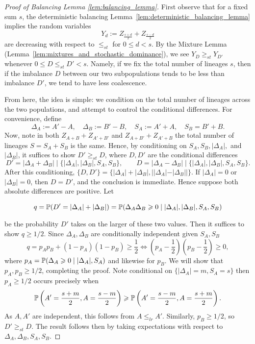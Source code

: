 \begin{proof}[Proof of Balancing Lemma \ref{lem:balancing_lemma}]
    First observe that for a fixed sum $s$, the deterministic balancing Lemma~\ref{lem:deterministic_balancing_lemma} implies the random variables
    \[Y_d := Z_{\frac{s+d}{2}} + Z_{\frac{s-d}{2}}\]
    \noindent are decreasing with respect to $\leq_{st}$ for $0 \leq d < s$. By the Mixture Lemma (Lemma~\ref{lem:mixtures_and_stochastic_dominance}),
    we see $Y_{D} \geq_{st} Y_{D'}$ whenever $0 \leq D \leq_{st} D' < s$. Namely, if we fix the total number of lineages $s$,
    then if the imbalance $D$ between our two subpopulations tends to be less than imbalance $D'$, we tend
    to have less coalescence.

    From here, the idea is simple: we condition on the total number of lineages across the two populations, and attempt
    to control the conditional differences. For convenience, define
    \[\Delta_A := A' - A, \quad \Delta_B := B' - B, \quad S_A := A' + A, \quad S_B = B' + B.\]
    Now, note in both $Z_{A + B} + Z_{A' + B'}$ and $Z_{A + B'} + Z_{A' + B}$ the total number of
    lineages $S = S_A + S_B$ is the same. Hence, by conditioning on $S_A,S_B, |\Delta_A|,$ and $|\Delta_B|$, it suffices to show $D' \geq_{st} D$,
    where $D,D'$ are the conditional differences
    \[D' = |\Delta_A + \Delta_B| \mid \{|\Delta_A|, |\Delta_B| , S_A, S_B \}, \qquad D = |\Delta_A - \Delta_B| \mid \{|\Delta_A|, |\Delta_B| , S_A, S_B \}.\]
    \noindent After this conditioning, $\{D, D'\} = \{|\Delta_A| + |\Delta_B|, ||\Delta_A| - |\Delta_B||\}$. If $|\Delta_A|=0$ or $|\Delta_B|=0$, then $D=D'$, and the conclusion is immediate. Hence suppose both absolute differences are positive. Let

    \[q = \P(D' = |\Delta_A| + |\Delta_B|) = \P(\Delta_A\Delta_B \geq 0 \mid |\Delta_A|, |\Delta_B| , S_A, S_B)\]

    \noindent be the probability $D'$ takes on the larger of these two values. Then it suffices to show $q \geq 1/2$. Since $\Delta_A, \Delta_B$ are conditionally independent given $S_A, S_B$
    \[q = p_Ap_B + (1-p_A)(1-p_B) \geq \frac{1}{2} \iff \left(p_A - \frac{1}{2} \right) \left(p_B - \frac{1}{2} \right) \geq 0,\]
    \noindent where $p_A = \P(\Delta_A \geq 0 \mid |\Delta_A|, S_A)$ and likewise for $p_B$. We will show that $p_A, p_B \geq 1/2$, completing the proof. Note conditional on $\{|\Delta_A| = m, S_A = s\}$ then $p_A \geq 1/2$ occurs precisely when
    \[\P\left(A'=\frac{s+m}{2}, A = \frac{s-m}{2}\right) \geq \P\left(A'=\frac{s-m}{2}, A = \frac{s+m}{2}\right).\]
    \noindent As $A,A'$ are independent, this follows from $A \leq_{lr} A'.$ Similarly, $p_B \geq 1/2$, so $D' \geq_{st} D$. The result
    follows then by taking expectations with respect to $\Delta_A, \Delta_B, S_A, S_B$.
\end{proof}


